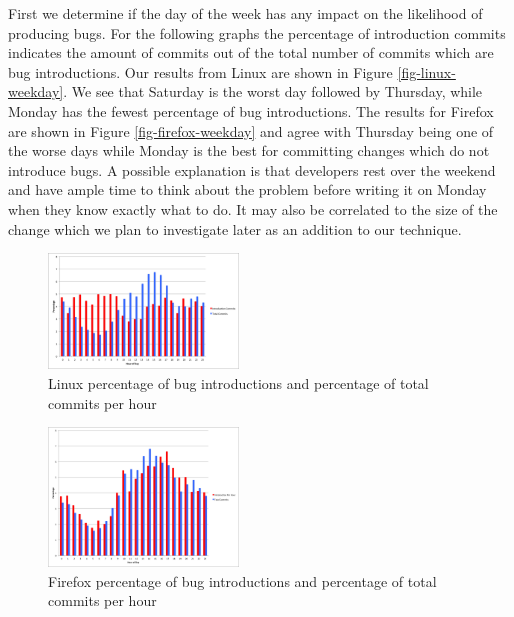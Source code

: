 First we determine if the day of the week has any impact on the
likelihood of producing bugs. For the following graphs the percentage
of introduction commits indicates the amount of commits out of the
total number of commits which are bug introductions. Our results from
Linux are shown in Figure \ref{fig-linux-weekday}. We see that
Saturday is the worst day followed by Thursday, while Monday has the
fewest percentage of bug introductions. The results for Firefox are
shown in Figure \ref{fig-firefox-weekday} and agree with Thursday
being one of the worse days while Monday is the best for committing
changes which do not introduce bugs. A possible explanation is that
developers rest over the weekend and have ample time to think about
the problem before writing it on Monday when they know exactly what to
do. It may also be correlated to the size of the change which we plan
to investigate later as an addition to our technique.

\begin{figure}
\begin{center}
\includegraphics[width=0.45\textwidth]{linux_hour_of_day.png}
\end{center}
\caption{Linux percentage of bug introductions and percentage of total commits per hour}
\label{fig-linux-hour}
\end{figure}

\begin{figure}
\begin{center}
\includegraphics[width=0.45\textwidth]{firefox_hour_of_day.png}
\end{center}
\caption{Firefox percentage of bug introductions and percentage of total commits per hour}
\label{fig-firefox-hour}
\end{figure}

